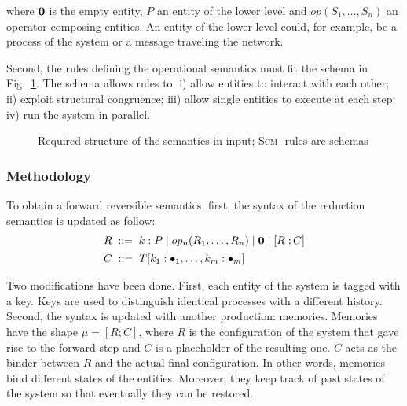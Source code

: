 \documentclass{article}[12pt,a4paper]
\theoremstyle{definition}
\newcommand{\paral}{\;|\;}
\begin{document}
where ${\bf{0}}$ is the empty entity, $P$ an entity of the lower level and $op(S_1,\ldots,S_n)$ an operator
composing entities. An entity of the lower-level could, for example, be a process of the system or
a message traveling the network.


Second, the rules defining the operational semantics must fit the schema in Fig.~\ref{fig:forwardrules}.
The schema allows rules to: i) allow entities to interact with each other; ii)
exploit structural congruence; iii) allow single entities to execute at each
step;
iv) run the system in parallel.

\begin{figure}[t]
  {\footnotesize
    }
  \caption{Required structure of the semantics in input; \textsc{Scm-} rules are schemas}
  \label{fig:forwardrules}
\end{figure}

\subsubsection{Methodology}\label{sec:methodology}


To obtain a forward reversible semantics, first, the syntax of the
reduction semantics is updated as follow:\\
\[
\begin{array}{l}
  R   \; ::=\;  k:P \paral \op(R_1,\ldots,R_n)\paral \nil \paral \mem{R}{\str} \\[1ex]
  \str \; ::= \; T[k_1:\blt_1,\dots,k_m:\blt_m]
\end{array}
\]

Two modifications have been done. First, each entity of the system is tagged with
a key. Keys are used to distinguish identical processes with a different
history. Second, the syntax is updated with another production: memories. Memories have
the shape $\mu=[R;C]$, where $R$ is the configuration of the
system that gave rise to the forward step and $C$ is a placeholder of the resulting one.
$C$ acts as the binder between $R$ and the actual final configuration. In
other words, memories bind different states of the entities. Moreover, they keep
track of past states of the system so that eventually they can be restored.
\end{document}
